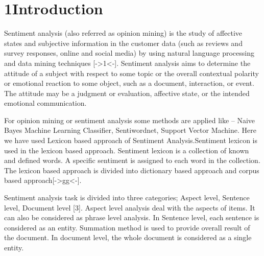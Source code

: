 \documentclass[12pt]{article}
\begin{document}
\section*{1\hspace*{10pt}Introduction}
\begin{justify}
Sentiment analysis (also referred as opinion mining) is the study of affective states and subjective information in the customer data (such as reviews and survey responses, online and social media) by using natural language processing and data mining techniques [->1<-]. Sentiment analysis aims to determine the attitude of a subject with respect to some topic or the overall contextual polarity or emotional reaction to some object, such as a document, interaction, or event. The attitude may be a judgment or evaluation, affective state, or the intended emotional communication.
\end{justify}\par

\begin{justify}
\tab For opinion mining or sentiment analysis some methods are applied like – Naive Bayes Machine Learning Classifier, Sentiwordnet, Support Vector Machine. Here we have used Lexicon based approach of Sentiment Analysis.Sentiment lexicon is used in the lexicon based approach. Sentiment lexicon is a collection of known and defined words. A specific sentiment is assigned to each word in the collection. The lexicon based approach is divided into dictionary based approach and corpus based approach[->gg<-].
\end{justify}\par

\begin{justify}
\tab Sentiment analysis task is divided into three categories; Aspect level, Sentence level, Document level [3]. Aspect level analysis deal with the aspects of items. It can also be considered as phrase level analysis. In Sentence level, each sentence is considered as an entity. Summation method is used to provide overall result of the document. In document level, the whole document is considered as a single entity.
\end{justify}\par


\vspace{\baselineskip}

\vspace{\baselineskip}
\end{document}
